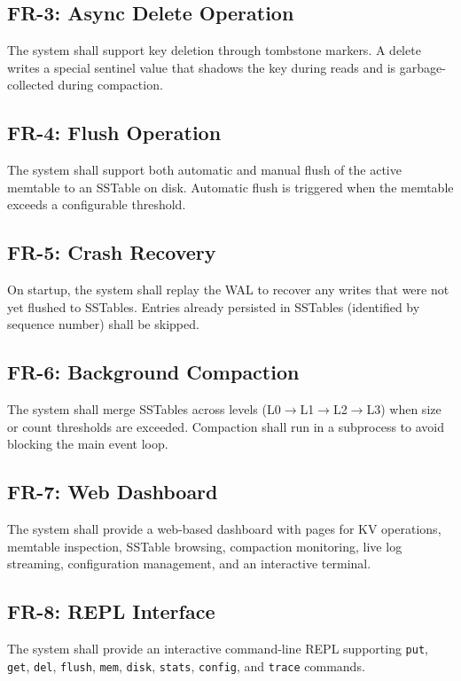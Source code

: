 \documentclass[oneside,a4paper,12pt]{book}
\begin{document}
\subsection{FR-3: Async Delete Operation}
The system shall support key deletion through tombstone markers. A delete writes a special sentinel value that shadows the key during reads and is garbage-collected during compaction.

\subsection{FR-4: Flush Operation}
The system shall support both automatic and manual flush of the active memtable to an SSTable on disk. Automatic flush is triggered when the memtable exceeds a configurable threshold.

\subsection{FR-5: Crash Recovery}
On startup, the system shall replay the WAL to recover any writes that were not yet flushed to SSTables. Entries already persisted in SSTables (identified by sequence number) shall be skipped.

\subsection{FR-6: Background Compaction}
The system shall merge SSTables across levels (L0$\rightarrow$L1$\rightarrow$L2$\rightarrow$L3) when size or count thresholds are exceeded. Compaction shall run in a subprocess to avoid blocking the main event loop.

\subsection{FR-7: Web Dashboard}
The system shall provide a web-based dashboard with pages for KV operations, memtable inspection, SSTable browsing, compaction monitoring, live log streaming, configuration management, and an interactive terminal.

\subsection{FR-8: REPL Interface}
The system shall provide an interactive command-line REPL supporting \texttt{put}, \texttt{get}, \texttt{del}, \texttt{flush}, \texttt{mem}, \texttt{disk}, \texttt{stats}, \texttt{config}, and \texttt{trace} commands.
\end{document}
